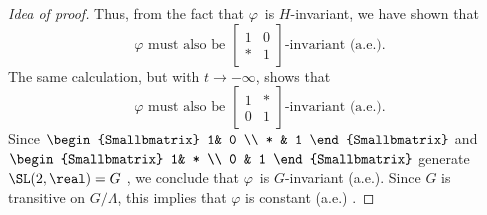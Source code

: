 \begin{proof}[Idea of proof]
Thus, from the fact that $\varphi$~is $H$-invariant, we have shown that 
	$$ \text{$\varphi$~must also be $\left[\begin{smallmatrix} 1& 0 \\ * & 1 \end{smallmatrix}\right]$-invariant (a.e.).} $$
The same calculation, but with $t \to -\infty$, shows that 
	$$ \text{$\varphi$ must also be $\left[\begin{smallmatrix} 1& * \\ 0 & 1 \end{smallmatrix}\right]$-invariant (a.e.).} $$
Since $\begin{Smallbmatrix} 1& 0 \\ * & 1 \end{Smallbmatrix}$ and $\begin{Smallbmatrix} 1& * \\ 0 & 1 \end{Smallbmatrix}$ generate $\SL(2,\real) = G$ , we conclude that $\varphi$~is $G$-invariant (a.e.). Since $G$ is transitive on $G/\Lambda$, this implies that $\varphi$ is constant (a.e.) .
\end{proof}





